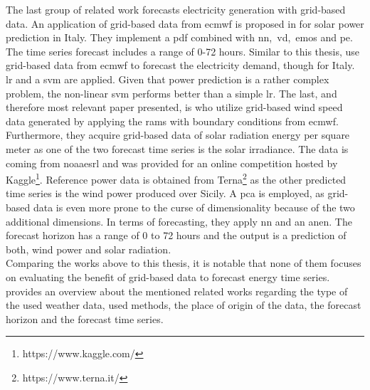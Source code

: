 The last group of related work forecasts electricity generation with grid-based data. An application of grid-based data from \gls{ecmwf} is proposed in  for solar power prediction in Italy. They implement a \gls{pdf} combined with \gls{nn},~\gls{vd},~\gls{emos} and \gls{pe}. The time series forecast includes a range of 0-72 hours. Similar to this thesis,  use grid-based data from \gls{ecmwf} to forecast the electricity demand, though for Italy. \gls{lr} and a \gls{svm} are applied. Given that power prediction is a rather complex problem, the non-linear \gls{svm} performs better than a simple \gls{lr}. The last, and therefore most relevant paper presented, is  who utilize grid-based wind speed data generated by applying the \gls{rams} with boundary conditions from \gls{ecmwf}. Furthermore, they acquire grid-based data of solar radiation energy per square meter as one of the two forecast time series is the solar irradiance. The data is coming from \gls{noaaesrl} and was provided for an online competition hosted by Kaggle\footnote{https://www.kaggle.com/}. Reference power data is obtained from Terna\footnote{https://www.terna.it/} as the other predicted time series is the wind power produced over Sicily. A \gls{pca} is employed, as grid-based data is even more prone to the curse of dimensionality because of the two additional dimensions. In terms of forecasting, they apply \gls{nn} and an \gls{anen}. The forecast horizon has a range of 0 to 72 hours and the output is a prediction of both, wind power and solar radiation.\\

Comparing the works above to this thesis, it is notable that none of them focuses on evaluating the benefit of grid-based data to forecast energy time series. %
 provides an overview about the mentioned related works regarding the type of the used weather data, used methods, the place of origin of the data, the forecast horizon and the forecast time series.\\

